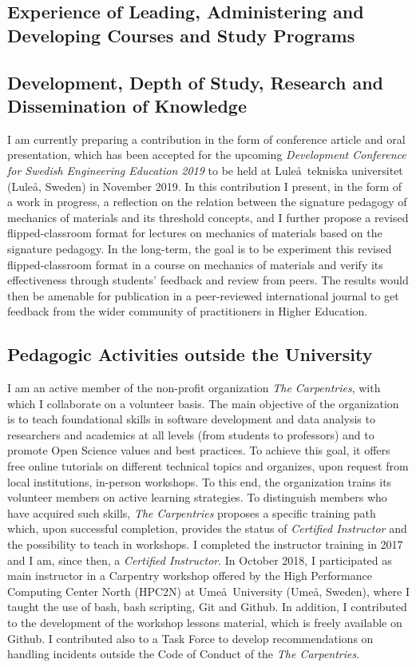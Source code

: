 \documentclass[
  a4paper, 
]{fortysecondscv}
\begin{document}
\subsection{Experience of Leading, Administering and Developing Courses and Study Programs}

\subsection{Development, Depth of Study, Research and Dissemination of Knowledge}
I am currently preparing a contribution in the form of conference article and oral presentation, which has been accepted for the upcoming \textit{Development Conference for Swedish Engineering Education 2019} to be held at Lule\aa\ tekniska universitet (Lule\aa, Sweden) in November 2019. In this contribution I present, in the form of a work in progress, a reflection on the relation between the signature pedagogy of mechanics of materials and its threshold concepts, and I further propose a revised flipped-classroom format for lectures on mechanics of materials based on the signature pedagogy. In the long-term, the goal is to be experiment this revised flipped-classroom format in a course on mechanics of materials and verify its effectiveness through students' feedback and review from peers. The results would then be amenable for publication in a peer-reviewed international journal to get feedback from the wider community of practitioners in Higher Education.

\subsection{Pedagogic Activities outside the University}
I am an active member of the non-profit organization \emph{The Carpentries}, with which I collaborate on a volunteer basis. The main objective of the organization is to teach foundational skills in software development and data analysis to researchers and academics at all levels (from students to professors) and to promote Open Science values and best practices. To achieve this goal, it offers free online tutorials on different technical topics and organizes, upon request from local institutions, in-person workshops. To this end, the organization trains its volunteer members on active learning strategies. To distinguish members who have acquired such skills, \emph{The Carpentries} proposes a specific training path which, upon successful completion, provides the status of \emph{Certified Instructor} and the possibility to teach in workshops. I completed the instructor training in 2017 and I am, since then, a \emph{Certified Instructor}. In October 2018, I participated as main instructor in a Carpentry workshop offered by the High Performance Computing Center North (HPC2N) at Ume\aa\ University (Ume\aa, Sweden), where I taught the use of bash, bash scripting, Git and Github. In addition, I contributed to the development of the workshop lessons material, which is freely available on Github. I contributed also to a Task Force to develop recommendations on handling incidents outside the Code of Conduct of the \emph{The Carpentries}.
\end{document}
